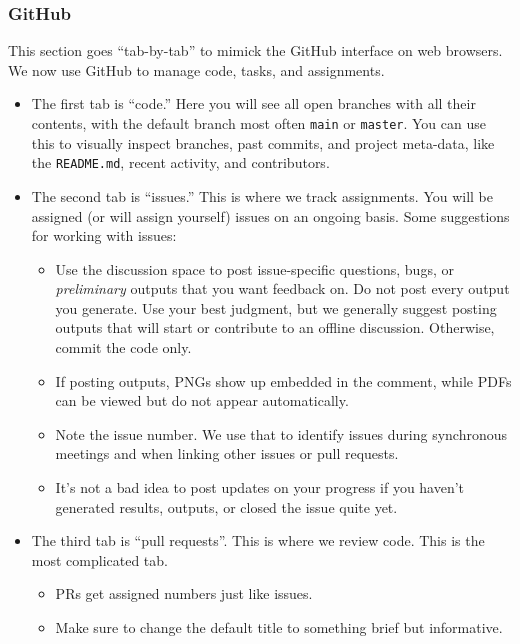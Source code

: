 \subsubsection{GitHub}
This section goes ``tab-by-tab'' to mimick the GitHub interface on web browsers. 
We now use GitHub to manage code, tasks, and assignments.
\begin{itemize}
    \item The first tab is ``code.'' 
    Here you will see all open branches with all their contents, 
    with the default branch most often \texttt{main} or \texttt{master}. 
    You can use this to visually inspect branches, past commits, and project meta-data, 
    like the \texttt{README.md}, recent activity, and contributors.
    \item The second tab is ``issues.'' 
    This is where we track assignments. 
    You will be assigned (or will assign yourself) issues on an ongoing basis. 
    Some suggestions for working with issues:
        \begin{itemize}
            \item Use the discussion space to post issue-specific questions, bugs, 
            or \textit{preliminary} outputs that you want feedback on. 
            Do not post every output you generate. 
            Use your best judgment, 
            but we generally suggest posting outputs that will start or contribute to an offline discussion. 
            Otherwise, commit the code only.
            \item If posting outputs, PNGs show up embedded in the comment,
             while PDFs can be viewed but do not appear automatically.
            \item Note the issue number. 
            We use that to identify issues during synchronous meetings 
            and when linking other issues or pull requests. 
            \item It's not a bad idea to post updates on your progress 
            if you haven't generated results, outputs, or closed the issue quite yet.
        \end{itemize}
        \item The third tab is ``pull requests''. 
        This is where we review code. 
        This is the most complicated tab.
        \begin{itemize}
            \item PRs get assigned numbers just like issues. 
            \item Make sure to change the default title to something brief but informative. 

\end{itemize}
\end{itemize}
